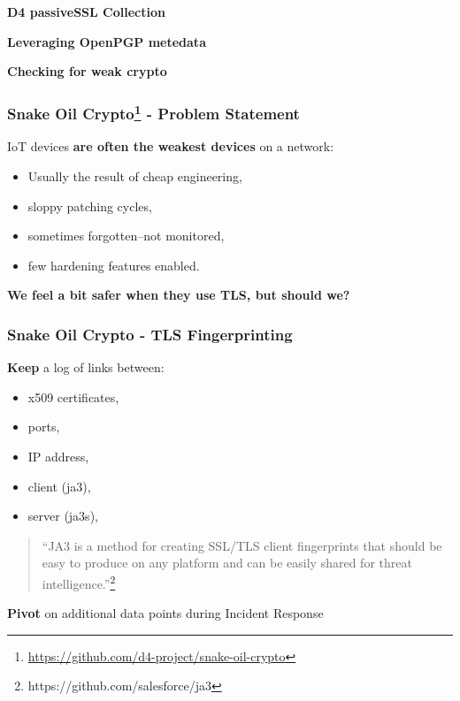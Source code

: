 \documentclass{beamer}
\begin{document}
\begin{frame}
  \begin{center}
    {\bf D4 passiveSSL Collection}
  \end{center}
\end{frame}

\begin{frame}
  \begin{center}
    {\bf Leveraging OpenPGP metedata}
  \end{center}
\end{frame}

\begin{frame}
  \begin{center}
    {\bf Checking for weak crypto}
  \end{center}
\end{frame}

\begin{frame}
  \frametitle{Snake Oil Crypto\footnote{\url{https://github.com/d4-project/snake-oil-crypto}} - Problem Statement}
  IoT devices {\bf are often the weakest devices} on a network:
        \begin{itemize}
        \item Usually the result of cheap engineering,
        \item sloppy patching cycles,
        \item sometimes forgotten--not monitored,
        \item few hardening features enabled.
        \end{itemize}

        \vspace{10 mm} 

{\bf We feel a bit safer when they use TLS, but should we?}

\end{frame}

\begin{frame}
  \frametitle{Snake Oil Crypto - TLS Fingerprinting}
        {\bf Keep} a log of links between:
        \begin{itemize}
          \item x509 certificates,
          \item ports,
          \item IP address,
          \item client (ja3),
          \item server (ja3s),
        \end{itemize}
        \begin{quote}
        ``JA3 is a method for creating SSL/TLS client fingerprints that should be easy to produce on any platform and can be easily shared for threat intelligence.''\footnote{https://github.com/salesforce/ja3}
        \end{quote}

         {\bf Pivot} on additional data points during Incident Response 
\end{frame}
\end{document}
